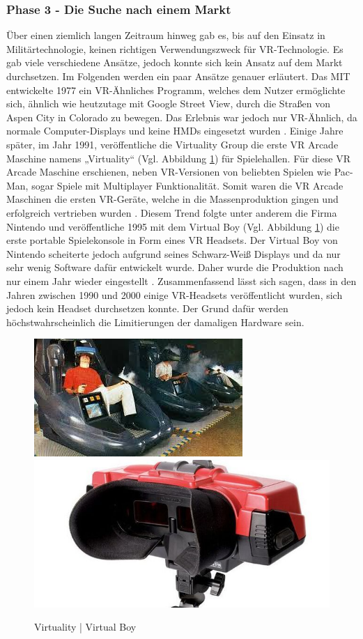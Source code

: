 \subsubsection{Phase 3 - Die Suche nach einem Markt}
Über einen ziemlich langen Zeitraum hinweg gab es, bis auf den Einsatz in Militärtechnologie, keinen richtigen Verwendungszweck für VR-Technologie. Es gab viele verschiedene Ansätze, jedoch konnte sich kein Ansatz auf dem Markt durchsetzen. Im Folgenden werden ein paar Ansätze genauer erläutert.
\newline
Das MIT entwickelte 1977 ein VR-Ähnliches Programm, welches dem Nutzer ermöglichte sich, ähnlich wie heutzutage mit Google Street View, durch die Straßen von Aspen City in Colorado zu bewegen. Das Erlebnis war jedoch nur VR-Ähnlich, da normale Computer-Displays und keine HMDs eingesetzt wurden \cite{20}.
\newline
Einige Jahre später, im Jahr 1991, veröffentliche die Virtuality Group die erste VR Arcade Maschine namens „Virtuality“ (Vgl. Abbildung \ref{fig:VirtualityVRBoy}) für Spielehallen. Für diese VR Arcade Maschine erschienen, neben VR-Versionen von beliebten Spielen wie Pac-Man, sogar Spiele mit Multiplayer Funktionalität. Somit waren die VR Arcade Maschinen die ersten VR-Geräte, welche in die Massenproduktion gingen und erfolgreich vertrieben wurden \cite{20}.
\newline
Diesem Trend folgte unter anderem die Firma Nintendo und veröffentliche 1995 mit dem Virtual Boy (Vgl. Abbildung \ref{fig:VirtualityVRBoy}) die erste portable Spielekonsole in Form eines VR Headsets. Der Virtual Boy von Nintendo scheiterte jedoch aufgrund seines Schwarz-Weiß Displays und da nur sehr wenig Software dafür entwickelt wurde. Daher wurde die Produktion nach nur einem Jahr wieder eingestellt \cite{20}.
\newline
Zusammenfassend lässt sich sagen, dass in den Jahren zwischen 1990 und 2000 einige VR-Headsets veröffentlicht wurden, sich jedoch kein Headset durchsetzen konnte. Der Grund dafür werden höchstwahrscheinlich die Limitierungen der damaligen Hardware sein.
\begin{figure}[h]
	\centering
	\includegraphics[width=0.4\linewidth]{Bilder/A17_Virtuality}
	\includegraphics[width=0.4\linewidth]{Bilder/A18_VIrtualBoy}
	\caption{Virtuality | Virtual Boy \cite{20, A18}}
	\label{fig:VirtualityVRBoy}
\end{figure}

